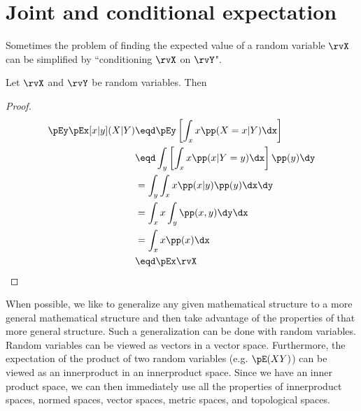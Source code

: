 \section{Joint and conditional expectation}
Sometimes the problem of finding the expected value of a random variable $\rvX$
can be simplified by ``conditioning $\rvX$ on $\rvY$".
\begin{theorem}
Let $\rvX$ and $\rvY$ be random variables. Then
\end{theorem}
\begin{proof}
\begin{align*}
   \pEy\pEx[x|y](X|Y)
     &\eqd \pEy \left[ \int_x x \pp(X=x|Y) \dx \right]
   \\&\eqd \int_y \left[\int_x x \pp(x|Y=y) \dx \right] \pp(y) \dy
   \\&=    \int_y \int_x x \pp(x|y)\pp(y) \dx   \dy
   \\&=    \int_x x \int_y \pp(x,y) \dy   \dx
   \\&=    \int_x x \pp(x) \dx
   \\&\eqd \pEx\rvX
\end{align*}
\end{proof}




When possible, we like to generalize any given mathematical structure
to a more general mathematical structure and then take advantage of
the properties of that more general structure.
Such a generalization can be done with random variables.
Random variables can be viewed as vectors in a vector space.
Furthermore, the expectation of the product of two random variables
(e.g. $\pE(XY)$)
can be viewed as an innerproduct in an innerproduct space.
Since we have an inner product space,
we can then immediately use all the properties of
innerproduct spaces, normed spaces, vector spaces, metric spaces,
and topological spaces.




